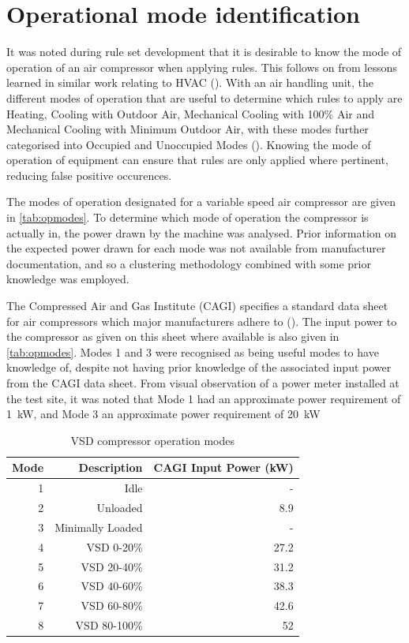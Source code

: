 \bigskip

\section{Operational mode identification}
\label{sec:modeidentification}
It was noted during rule set development that it is desirable to know the mode of operation of an air compressor when applying rules. This follows on from lessons learned in similar work relating to HVAC (\cite{Bruton2014}). With an air handling unit, the different modes of operation that are useful to determine which rules to apply are Heating, Cooling with Outdoor Air, Mechanical Cooling with 100\% Air and Mechanical Cooling with Minimum Outdoor Air, with these modes further categorised into Occupied and Unoccupied Modes (\cite{House2001}). Knowing the mode of operation of equipment can ensure that rules are only applied where pertinent, reducing false positive occurences.

The modes of operation designated for a variable speed air compressor are given in \autoref{tab:opmodes}. To determine which mode of operation the compressor is actually in, the power drawn by the machine was analysed. Prior information on the expected power drawn for each mode was not available from manufacturer documentation, and so a clustering methodology combined with some prior knowledge was employed.

The Compressed Air and Gas Institute (CAGI) specifies a standard data sheet for air compressors which major manufacturers adhere to (\cite{CAGI}). The input power to the compressor as given on this sheet where available is also given in \autoref{tab:opmodes}. Modes 1 and 3 were recognised as being useful modes to have knowledge of, despite not having prior knowledge of the associated input power from the CAGI data sheet. From visual observation of a power meter installed at the test site, it was noted that Mode 1 had an approximate power requirement of \SI{1}{\kilo \watt}, and Mode 3 an approximate power requirement of \SI{20}{\kilo \watt}

\begin{table}[htbp]
  \centering
  \caption{VSD compressor operation modes}
    \begin{tabular}{rrr}
    \toprule
    Mode  & Description & CAGI Input Power (kW)\\
    \midrule
    1     & Idle & -\\
    2     & Unloaded & 8.9 \\
    3     & Minimally Loaded & - \\
    4     & VSD 0-20\% & 27.2 \\
    5     & VSD 20-40\% & 31.2 \\
    6     & VSD 40-60\% & 38.3\\
    7     & VSD 60-80\% & 42.6 \\
    8     & VSD 80-100\% & 52\\
    \bottomrule
    \end{tabular}%
  \label{tab:opmodes}%
\end{table}%


